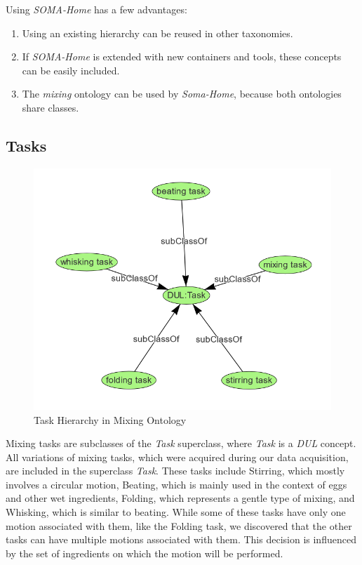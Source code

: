 Using \textit{SOMA-Home} has a few advantages:
\begin{enumerate}
    \item Using an existing hierarchy can be reused in other taxonomies.
    \item If \textit{SOMA-Home} is extended with new containers and tools, these concepts can be easily included.
    \item The \textit{mixing} ontology can be used by \textit{Soma-Home}, because both ontologies share classes.
\end{enumerate}

\subsection{Tasks}

\begin{figure}[H]
    \includegraphics[scale=0.45]{Graphics/classHierarchy/task_hierarchy.png}
    \centering
    \caption{Task Hierarchy in Mixing Ontology}
\end{figure}

Mixing tasks are subclasses of the \textit{Task} superclass, where \textit{Task} is a \textit{DUL} concept. 
All variations of mixing tasks, which were acquired during our data acquisition, are included in the superclass \textit{Task}. 
These tasks include Stirring, which mostly involves a circular motion, Beating, which is mainly used in the context of eggs and other wet ingredients, 
Folding, which represents a gentle type of mixing, and Whisking, which is similar to beating. 
While some of these tasks have only one motion associated with them, like the Folding task, 
we discovered that the other tasks can have multiple motions associated with them. 
This decision is influenced by the set of ingredients on which the motion will be performed.

